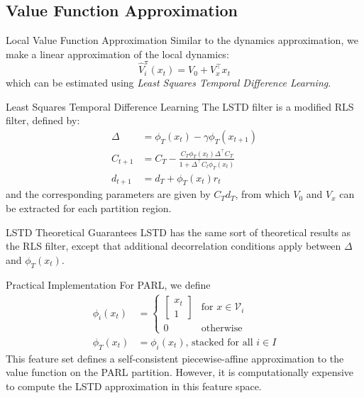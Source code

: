 \documentclass{beamer}
\begin{document}
\subsection{Value Function Approximation}

\begin{frame}{Local Value Function Approximation}
  Similar to the dynamics approximation, we make a linear approximation of the local dynamics:
  \begin{equation}
    \hat{V}^{\pi}_i(x_t) = V_0 + V_x^\top x_t
  \end{equation}
  which can be estimated using \emph{Least Squares Temporal Difference Learning}.
\end{frame}

\begin{frame}{Least Squares Temporal Difference Learning}
  The LSTD filter is a modified RLS filter, defined by:
  \begin{align*}
    \Delta &= \phi_T(x_t) - \gamma \phi_T(x_{t+1})\\
    C_{t+1} &= C_T - \frac{C_T \phi_T(x_t) \Delta^\top C_T}{1 + \Delta^\top C_t \phi_T(x_t)}\\
    d_{t+1} &= d_T + \phi_T(x_t)r_t
  \end{align*}
  and the corresponding parameters are given by $C_T d_T$, from which $V_0$ and $V_x$ can be extracted for each partition region.
\end{frame}

\begin{frame}{LSTD Theoretical Guarantees}
  LSTD has the same sort of theoretical results as the RLS filter, except that
  additional decorrelation conditions apply between $\Delta$ and $\phi_T(x_t)$.
\end{frame}

\begin{frame}{Practical Implementation}
  For PARL, we define
  \begin{align*}
    \phi_i(x_t) &= \begin{cases} \begin{bmatrix} x_t \\ 1 \end{bmatrix} & \text{for } x \in \mathcal{V}_i \\ 0  &\text{otherwise}\end{cases} \\
    \phi_T(x_t) &= \phi_i(x_t) \text{, stacked for all $i \in I$}
  \end{align*}
  This feature set defines a self-consistent piecewise-affine approximation to
  the value function on the PARL partition. However, it is computationally
  expensive to compute the LSTD approximation in this feature space. 
\end{frame}
\end{document}
